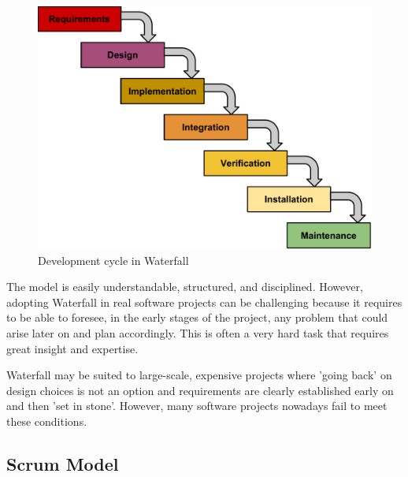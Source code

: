 \begin{figure}[h]
\begin{center}
\includegraphics[scale=0.6]{../Figures/Waterfall-model.pdf}
\end{center}
\caption{Development cycle in Waterfall}
\label{figure:waterfall-model}
\end{figure}

The model is easily understandable, structured, and disciplined.
However, adopting Waterfall in real software projects can be challenging because it requires to be able to foresee, in the early stages of the project, any problem that could arise later on and plan accordingly.
This is often a very hard task that requires great insight and expertise.

Waterfall may be suited to large-scale, expensive projects where 'going back' on design choices is not an option and requirements are clearly established early on and then 'set in stone'.
However, many software projects nowadays fail to meet these conditions. \cite{WaterfallModel}

\subsection{Scrum Model}

